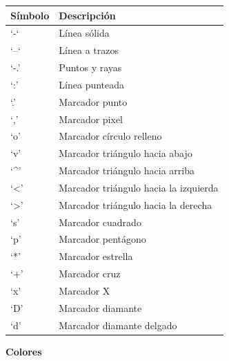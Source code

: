 \documentclass[letterpaper,10pt,spanish]{sphinxmanual}
\begin{document}
\begin{tabulary}{\linewidth}{|L|L|}
\hline
\textbf{
Símbolo
} & \textbf{
Descripción
}\\
\hline

`-`
 & 
Línea sólida
\\

`--`
 & 
Línea a trazos
\\

`-.'
 & 
Puntos y rayas
\\

`:'
 & 
Línea punteada
\\

`.'
 & 
Marcador punto
\\

`,'
 & 
Marcador pixel
\\

`o'
 & 
Marcador círculo relleno
\\

`v'
 & 
Marcador triángulo hacia abajo
\\

`\textasciicircum{}'
 & 
Marcador triángulo hacia arriba
\\

`\textless{}'
 & 
Marcador triángulo hacia la izquierda
\\

`\textgreater{}'
 & 
Marcador triángulo hacia la derecha
\\

`s'
 & 
Marcador cuadrado
\\

`p'
 & 
Marcador pentágono
\\

`*'
 & 
Marcador estrella
\\

`+'
 & 
Marcador cruz
\\

`x'
 & 
Marcador X
\\

`D'
 & 
Marcador diamante
\\

`d'
 & 
Marcador diamante delgado
\\
\hline
\end{tabulary}


\textbf{Colores}
\end{document}
